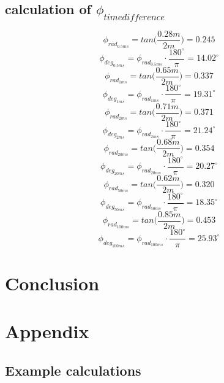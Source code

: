 \documentclass{article}
\begin{document}
\subsection{calculation of $\phi_{timedifference}$}
$$\phi_{rad_{0.5ms}}=tan\bigg(\frac{0.28m}{2m}\bigg)=0.245$$
$$\phi_{deg_{0.5ms}}=\phi_{rad_{0.5ms}}\cdot\frac{180^\circ}{\pi}=14.02^\circ$$
$$\phi_{rad_{1ms}}=tan\bigg(\frac{0.65m}{2m}\bigg)=0.337$$
$$\phi_{deg_{1ms}}=\phi_{rad_{1ms}}\cdot\frac{180^\circ}{\pi}=19.31^\circ$$
$$\phi_{rad_{2ms}}=tan\bigg(\frac{0.71m}{2m}\bigg)=0.371$$
$$\phi_{deg_{2ms}}=\phi_{rad_{2ms}}\cdot\frac{180^\circ}{\pi}=21.24^\circ$$
$$\phi_{rad_{20ms}}=tan\bigg(\frac{0.68m}{2m}\bigg)=0.354$$
$$\phi_{deg_{20ms}}=\phi_{rad_{20ms}}\cdot\frac{180^\circ}{\pi}=20.27^\circ$$
$$\phi_{rad_{50ms}}=tan\bigg(\frac{0.62m}{2m}\bigg)=0.320$$
$$\phi_{deg_{50ms}}=\phi_{rad_{50ms}}\cdot\frac{180^\circ}{\pi}=18.35^\circ$$
$$\phi_{rad_{100ms}}=tan\bigg(\frac{0.85m}{2m}\bigg)=0.453$$
$$\phi_{deg_{100ms}}=\phi_{rad_{100ms}}\cdot\frac{180^\circ}{\pi}=25.93^\circ$$

\newpage
\section{Conclusion}

\newpage
\section{Appendix}
\subsection{Example calculations}
\end{document}
